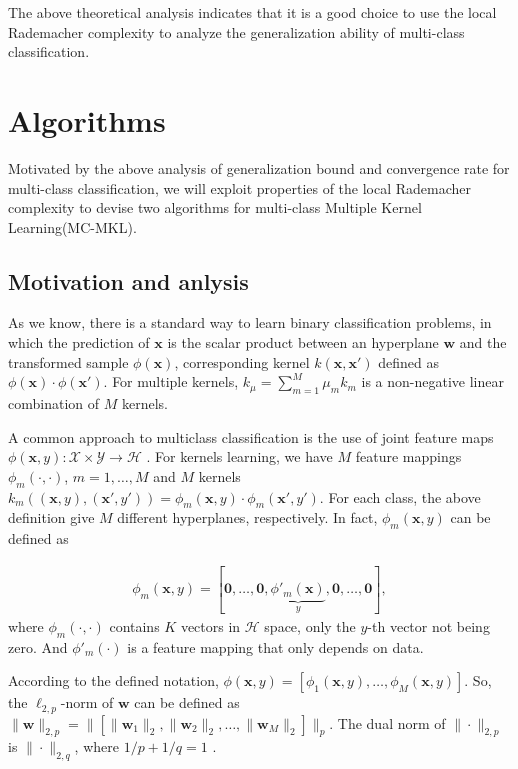 \documentclass{article}
\begin{document}
The above theoretical analysis indicates that it is a good
choice to use the local Rademacher complexity to analyze the generalization
ability of multi-class classification.

\section{Algorithms}
Motivated by the above analysis of generalization bound and convergence rate for multi-class classification, we will exploit properties of the local Rademacher complexity to devise two algorithms for multi-class Multiple Kernel Learning(MC-MKL).
\subsection{Motivation and anlysis}
As we know, there is a standard way to learn binary classification problems, in which the prediction of $\mathbf x$ is the scalar product between an hyperplane $\mathbf w$ and the transformed sample $\phi(\mathbf x)$, corresponding kernel $k(\mathbf x, \mathbf x')$ defined as $\phi(\mathbf x) \cdot \phi(\mathbf x')$. For multiple kernels, $k_\mu=\sum_{m=1}^M \mu_mk_m$ is a non-negative linear combination of $M$ kernels\cite{BachLJ04}.

A common approach to multiclass classification is the use of joint feature maps $\phi(\mathbf x, y):\mathcal X \times \mathcal Y \to \mathcal H$ \cite{TsochantaridisHJA04}. For kernels learning, we have $M$ feature mappings $\phi_m(\cdot,\cdot)$, $m=1,\ldots,M$ and $M$ kernels $k_m((\mathbf x, y),(\mathbf x', y'))=\phi_m(\mathbf x, y) \cdot \phi_m(\mathbf x', y')$. For each class, the above definition give $M$ different hyperplanes, respectively. In fact, $\phi_m(\mathbf x, y)$ can be defined as

\begin{align*}
   \phi_m(\mathbf x, y)=[\mathbf 0,\ldots, \mathbf 0,\underbrace{\phi'_m(\mathbf x)}_{y},\mathbf 0,\ldots,\mathbf 0],
\end{align*}
where $\phi_m(\cdot, \cdot)$ contains $K$ vectors in $\mathcal{H}$ space, only the $y$-th vector not being zero. And $\phi'_m(\cdot)$ is a feature mapping that only depends on data.

According to the defined notation, $\phi(\mathbf x, y)=[\phi_1(\mathbf x, y),\ldots, \phi_M(\mathbf x, y)]$. So, the $\ell_{2,p}$-norm of $\mathbf{w}$ can be defined as $\|\mathbf w\|_{2,p}=\|[\|\mathbf{w}_1\|_2,\|\mathbf{w}_2\|_2,\ldots,\|\mathbf{w}_M\|_2]\|_p$. The dual norm of $\|\cdot\|_{2,p}$ is $\|\cdot\|_{2,q}$, where $1/p+1/q=1$ \cite{kakade2009duality}.
\end{document}

